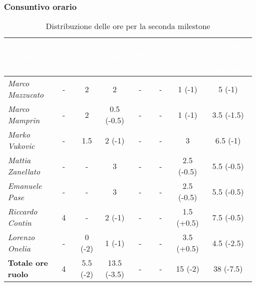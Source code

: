 \subsubsection{Consuntivo orario}
\begin{table}[H]
    \renewcommand\arraystretch{1.5}
    \centering
    \begin{adjustwidth}{-1.25cm}{}
    \begin{tabular}{|l|c|c|c|c|c|c|c|}
    \hline
    \rowcolor[HTML]{036400}
    \textcolor{white}{\textbf{Membro}} & \multicolumn{1}{c|}{\textcolor{white}{\textbf{RE}}} & \multicolumn{1}{c|}{\textcolor{white}{\textbf{AM}}} & \multicolumn{1}{c|}{\textcolor{white}{\textbf{AN}}} & \multicolumn{1}{c|}{\textcolor{white}{\textbf{PT}}} & \multicolumn{1}{c|}{\textcolor{white}{\textbf{PR}}} & \multicolumn{1}{c|}{\textcolor{white}{\textbf{VE}}} & \multicolumn{1}{c|}{\textcolor{white}{\textbf{Totale ore persona}}} \\ \hline
    \rowcolor[HTML]{EFEFEF}\textit{Marco Mazzucato}  & -      & 2            & 2          & - & - & 1 (-1)        & 5 (-1)         \\ \hline
    \rowcolor[HTML]{C0C0C0}\textit{Marco Mamprin}    & -      & 2            & 0.5 (-0.5)   & - & - & 1 (-1)        & 3.5 (-1.5)       \\ \hline
    \rowcolor[HTML]{EFEFEF}\textit{Marko Vukovic}    & -      & 1.5          & 2 (-1)     & - & - & 3             & 6.5 (-1)       \\ \hline
    \rowcolor[HTML]{C0C0C0}\textit{Mattia Zanellato} & -      & -            & 3          & - & - & 2.5 (-0.5)      & 5.5 (-0.5)       \\ \hline
    \rowcolor[HTML]{EFEFEF}\textit{Emanuele Pase}    & -      & -            & 3          & - & - & 2.5 (-0.5)      & 5.5 (-0.5)       \\ \hline
    \rowcolor[HTML]{C0C0C0}\textit{Riccardo Contin}  & 4      & -            & 2 (-1)     & - & - & 1.5 (+0.5)      & 7.5 (-0.5)       \\ \hline
    \rowcolor[HTML]{EFEFEF}\textit{Lorenzo Onelia}   & -      & 0 (-2)       & 1 (-1)     & - & - & 3.5 (+0.5)      & 4.5 (-2.5)       \\ \hline
    \rowcolor[HTML]{C0C0C0}\textbf{Totale ore ruolo} & 4      & 5.5 (-2)     & 13.5 (-3.5)  & - & - & 15 (-2)       & 38 (-7.5)    \\ \hline
    \end{tabular}
    \end{adjustwidth}
    \caption{Distribuzione delle ore per la seconda milestone}
\end{table}

